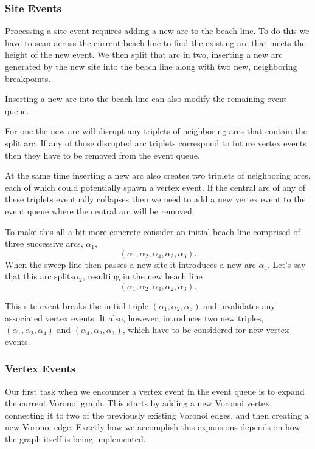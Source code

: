 \documentclass[
  letterpaper,
  DIV=11,
  numbers=noendperiod]{scrartcl}
\begin{document}
\subsubsection{Site Events}\label{site-events}

Processing a site event requires adding a new arc to the beach line. To
do this we have to scan across the current beach line to find the
existing arc that meets the height of the new event. We then split that
arc in two, inserting a new arc generated by the new site into the beach
line along with two new, neighboring breakpoints.

Inserting a new arc into the beach line can also modify the remaining
event queue.

For one the new arc will disrupt any triplets of neighboring arcs that
contain the split arc. If any of those disrupted arc triplets correspond
to future vertex events then they have to be removed from the event
queue.

At the same time inserting a new arc also creates two triplets of
neighboring arcs, each of which could potentially spawn a vertex event.
If the central arc of any of these triplets eventually collapses then we
need to add a new vertex event to the event queue where the central arc
will be removed.

To make this all a bit more concrete consider an initial beach line
comprised of three successive arcs, \(\alpha_{1}\), \[
( \alpha_{1}, \alpha_{2}, \alpha_{4}, \alpha_{2}, \alpha_{3}).
\] When the sweep line then passes a new site it introduces a new arc
\(\alpha_{4}\). Let's say that this arc splits\(\alpha_{2}\), resulting
in the new beach line \[
( \alpha_{1}, \alpha_{2}, \alpha_{4}, \alpha_{2}, \alpha_{3}).
\]

This site event breaks the initial triple
\(( \alpha_{1}, \alpha_{2}, \alpha_{3})\) and invalidates any associated
vertex events. It also, however, introduces two new triples,
\(( \alpha_{1}, \alpha_{2}, \alpha_{4})\) and
\(( \alpha_{4}, \alpha_{2}, \alpha_{3})\), which have to be considered
for new vertex events.

\subsubsection{Vertex Events}\label{vertex-events}

Our first task when we encounter a vertex event in the event queue is to
expand the current Voronoi graph. This starts by adding a new Voronoi
vertex, connecting it to two of the previously existing Voronoi edges,
and then creating a new Voronoi edge. Exactly how we accomplish this
expansions depends on how the graph itself is being implemented.
\end{document}
